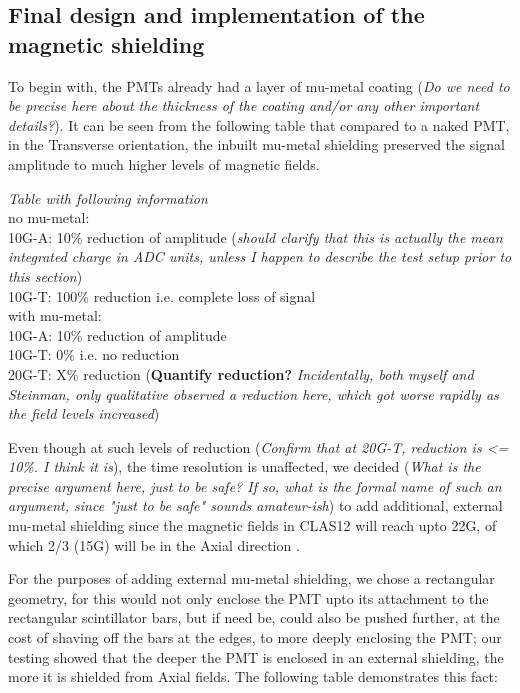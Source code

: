 \documentclass[12pt]{article}
\begin{document}
\subsection{Final design and implementation of the magnetic shielding}
To begin with, the PMTs already had a layer of mu-metal coating (\textit{Do we need to be precise here about the thickness of the coating and/or any other important details?}). It can be seen from the following table that compared to a naked PMT, in the Transverse orientation, the inbuilt mu-metal shielding preserved the signal amplitude to much higher levels of magnetic fields.

\textit{Table with following information} \\
no mu-metal: \\
10G-A: 10\% reduction of amplitude (\textit{should clarify that this is actually the mean integrated charge in ADC units, unless I happen to describe the test setup prior to this section}) \\
10G-T: 100\% reduction i.e. complete loss of signal \\
with mu-metal: \\
10G-A: 10\% reduction of amplitude \\
10G-T: 0\% i.e. no reduction \\
20G-T: X\% reduction (\textbf{Quantify reduction?} \textit{Incidentally, both myself and Steinman, only qualitative observed a reduction here, which got worse rapidly as the field levels increased})

Even though at such levels of reduction (\textit{Confirm that at 20G-T, reduction is <= 10\%. I think it is}), the time resolution is unaffected, we decided (\textit{What is the precise argument here, just to be safe? If so, what is the formal name of such an argument, since "just to be safe" sounds amateur-ish}) to add additional, external mu-metal shielding since the magnetic fields in CLAS12 will reach upto 22G, of which 2/3 (15G) will be in the Axial direction \cite{CLAS12FTOFstudies}. 

For the purposes of adding external mu-metal shielding, we chose a rectangular geometry, for this would not only enclose the PMT upto its attachment to the rectangular scintillator bars, but if need be, could also be pushed further, at the cost of shaving off the bars at the edges, to more deeply enclosing the PMT; our testing showed that the deeper the PMT is enclosed in an external shielding, the more it is shielded from Axial fields. The following table demonstrates this fact:
\end{document}
